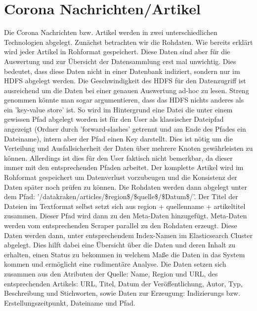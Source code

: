 \documentclass[12pt,oneside,a4paper,parskip]{scrbook}
\begin{document}
\section{Corona Nachrichten/Artikel}
Die Corona Nachrichten bzw. Artikel werden in zwei unterschiedlichen Technologien abgelegt. Zun\"achst betrachten wir die Rohdaten. Wie bereits erkl\"art wird jeder Artikel in Rohformat gespeichert. Diese Daten sind aber f\"ur die Auswertung und zur \"Ubersicht der Datensammlung erst mal unwichtig. Dies bedeutet, dass diese Daten nicht in einer Datenbank indiziert, sondern nur im HDFS abgelegt werden. Die Geschwindigkeit des HDFS f\"ur den Datenzugriff ist ausreichend um die Daten bei einer genauen Auswertung ad-hoc zu lesen. Streng genommen k\"onnte man sogar argumentieren, dass das HDFS nichts anderes als ein 'key-value store' ist. So wird im Hintergrund eine Datei die unter einem gewissen Pfad abgelegt worden ist f\"ur den User als klassischer Dateipfad angezeigt (Ordner durch 'forward-slashes' getrennt und am Ende des Pfades ein Dateiname), intern aber der Pfad einen Key darstellt. Dies ist n\"otig um die Verteilung und Ausfallsicherheit der Daten \"uber mehrere Knoten gew\"ahrleisten zu k\"onnen. Allerdings ist dies f\"ur den User faktisch nicht bemerkbar, da dieser immer mit den entsprechenden Pfaden arbeitet.
Der komplette Artikel wird im Rohformat gespeichert um Datenverlust vorzubeugen und die Konsistenz der Daten sp\"ater noch pr\"ufen zu k\"onnen. Die Rohdaten werden dann abgelegt unter dem Pfad: '/datakraken/articles/\$region\$/\$quelle\$/\$Datum\$/'. Der Titel der Dateien im Textformat selbst setzt sich aus region + quellenname + artikeltitel zusammen. Dieser Pfad wird dann zu den Meta-Daten hinzugef\"ugt. Meta-Daten werden vom entsprechenden Scraper parallel zu den Rohdaten erzeugt. Diese Daten werden dann, unter entsprechendem Index-Namen im Elasticsearch Cluster abgelegt. Dies hilft dabei eine \"Ubersicht über die Daten und deren Inhalt zu erhalten, einen Status zu bekommen in welchem Maße die Daten in das System kommen und erm\"oglicht eine rudiment\"are Analyse. Die Daten setzen sich zusammen aus den Atributen der Quelle: Name, Region und URL, des entsprechenden Artikels: URL, Titel, Datum der Veröffentlichung, Autor, Typ, Beschreibung und Stichworten, sowie Daten zur Erzeugung: Indizierungs bzw. Erstellungszeitpunkt, Dateiname und Pfad.
\end{document}
